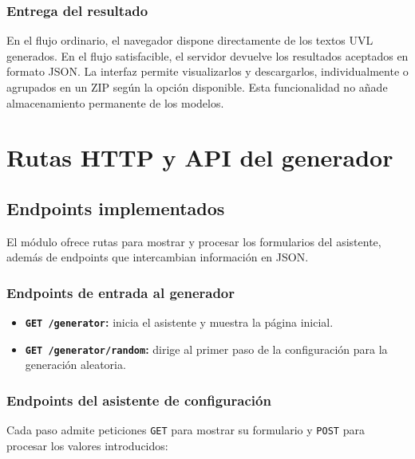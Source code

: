 \subsubsection*{Entrega del resultado}

En el flujo ordinario, el navegador dispone directamente de los textos UVL
generados. En el flujo satisfacible, el servidor devuelve los resultados
aceptados en formato JSON. La interfaz permite visualizarlos y descargarlos,
individualmente o agrupados en un ZIP según la opción disponible. Esta
funcionalidad no añade almacenamiento permanente de los modelos.

\section{Rutas HTTP y API del generador}
\label{sec:api}

\subsection{Endpoints implementados}
\label{subsec:endpoints}

El módulo ofrece rutas para mostrar y procesar los formularios del
asistente, además de endpoints que intercambian información en JSON.

\subsubsection*{Endpoints de entrada al generador}

\begin{itemize}
    \item \textbf{\texttt{GET /generator}:} inicia el asistente y muestra
    la página inicial.

    \item \textbf{\texttt{GET /generator/random}:} dirige al primer paso de
    la configuración para la generación aleatoria.
\end{itemize}

\subsubsection*{Endpoints del asistente de configuración}

Cada paso admite peticiones \texttt{GET} para mostrar su formulario y
\texttt{POST} para procesar los valores introducidos:

